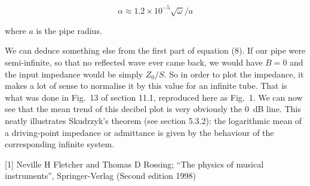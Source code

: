   $$ \alpha \approx 1.2 \times 10^{-5} \sqrt{\omega}/a \tag{10}$$ 

  where $a$ is the pipe radius. 

  We can deduce something else from the first part of equation (8). If our pipe 
  were semi-infinite, so that no reflected wave ever came back, we would have 
  $B=0$ and the input impedance would be simply $Z_0/S$. So in order to plot 
  the impedance, it makes a lot of sense to normalise it by this value for an 
  infinite tube. That is what was done in Fig.\ 13 of section 11.1, reproduced 
  here as Fig.\ 1. We can now see that the mean trend of this decibel plot is 
  very obviously the 0 dB line. This neatly illustrates Skudrzyk's theorem (see 
  section 5.3.2): the logarithmic mean of a driving-point impedance or 
  admittance is given by the behaviour of the corresponding infinite system. 


  \sectionreferences{}[1] Neville H Fletcher and Thomas D Rossing; “The physics 
  of musical instruments”, Springer-Verlag (Second edition 1998) 